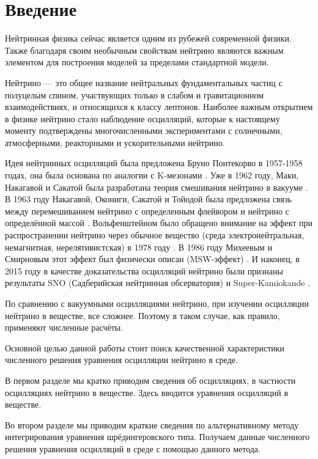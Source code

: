 \documentclass[a4paper,12pt]{article}
\begin{document}
\setcounter{page}{2}

\thispagestyle{empty}
\tableofcontents

\newpage

	\section*{Введение}
Нейтринная физика сейчас является одним из рубежей современной физики. Также благодаря своим необычным свойствам нейтрино являются важным элементом для построения моделей за пределами стандартной модели.

Нейтрино --- это общее название нейтральных фундаментальных частиц с полуцелым спином, участвующих только в слабом и гравитационном взаимодействиях, и относящихся к классу лептонов. Наиболее важным открытием в физике нейтрино стало наблюдение осцилляций, которые к настоящему моменту подтверждены многочисленными экспериментами с солнечными, атмосферными, реакторными и ускорительными нейтрино.

Идея нейтринных осцилляций была предложена Бруно Понтекорво в 1957-1958 годах, она была основана по аналогии с K-мезонами \cite{11, 22}. Уже в 1962 году, Маки, Накагавой и Сакатой была разработана теория смешивания нейтрино в вакууме \cite{33}. В 1963 году Накагавой, Окониги, Сакатой и Тойодой была предложена связь между перемешиванием нейтрино с определенным флейвором и нейтрино с определённой массой \cite{44}. Вольфенштейном было обращено внимание на эффект при распространении нейтрино через обычное вещество (среда электронейтральная, немагнитная, нерелятивистская) в 1978 году \cite{55, 66}. В 1986 году Михеевым и Смирновым этот эффект был физически описан (MSW-эффект) \cite{77, 88}. И наконец, в 2015 году в качестве доказательства осцилляций нейтрино были признаны результаты SNO (Садберийская нейтринная обсерватория) \cite{99} и Super-Kamiokande \cite{1010}.

По сравнению с вакуумными осцилляциями нейтрино, при изучении осцилляции нейтрино в веществе, все сложнее. Поэтому в таком случае, как правило, применяют численные расчёты.

Основной целью данной работы стоит поиск качественной характеристики численного решения уравнения осцилляции нейтрино в среде.

В первом разделе мы кратко приводим сведения об осцилляциях, в частности осцилляциях нейтрино в веществе. Здесь вводится уравнения осцилляций в веществе.

Во втором разделе мы приводим краткие сведения по альтернативному методу интегрирования уравнения шрёдингеровского типа. Получаем данные численного решения уравнения осцилляций в среде с помощью данного метода.
\end{document}

